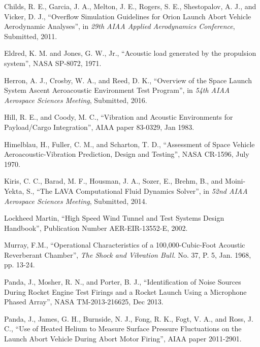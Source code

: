 \documentclass[]{aiaa-tc}%
\begin{document}
\begin{thebibliography}{9}%

Childs, R. E., Garcia, J. A., Melton, J. E., Rogers, S. E., Shestopalov, A. J., and Vicker, D. J., ``Overflow Simulation Guidelines for Orion Launch
Abort Vehicle Aerodynamic Analyses'', in {\it 29th AIAA Applied Aerodynamics Conference}, Submitted, 2011.

Eldred, K. M. and Jones, G. W., Jr., ``Acoustic load generated by the propulsion system'', NASA SP-8072, 1971.

Herron, A. J., Crosby, W. A., and Reed, D. K., ``Overview of the Space Launch System Ascent Aeroacoustic Environment Test Program'', in {\it 54th AIAA Aerospace Sciences Meeting}, Submitted, 2016.

Hill, R. E., and Coody, M. C., ``Vibration and Acoustic Environments for Payload/Cargo Integration'', AIAA paper 83-0329, Jan 1983.

Himelblau, H., Fuller, C. M., and Scharton, T. D., ``Assessment of Space Vehicle Aeroacoustic-Vibration Prediction, Design and Testing'', NASA CR-1596, July 1970.

Kiris, C. C., Barad, M. F., Housman, J. A., Sozer, E., Brehm, B., and Moini-Yekta, S.,  ``The LAVA Computational Fluid Dynamics Solver'', in {\it 52nd AIAA Aerospace Sciences Meeting}, Submitted, 2014.

Lockheed Martin,  ``High Speed Wind Tunnel and Test Systems Design Handbook'', Publication Number AER-EIR-13552-E, 2002.

Murray, F.M.,  ``Operational Characteristics of a 100,000-Cubic-Foot Acoustic Reverberant Chamber'', {\it The Shock and Vibration Bull.} No. 37, P. 5, Jan. 1968, pp. 13-24.

Panda, J., Mosher, R. N., and Porter, B. J., ``Identification of Noise Sources During Rocket Engine Test Firings and a Rocket Launch Using a Microphone Phased Array'', NASA TM-2013-216625, Dec 2013.

Panda, J., James, G. H., Burnside, N. J., Fong, R. K., Fogt, V. A., and Ross, J. C., ``Use of Heated Helium to Measure Surface Pressure Fluctuations on the Launch Abort Vehicle During Abort Motor Firing'', AIAA paper 2011-2901.


\end{thebibliography}
\end{document}
